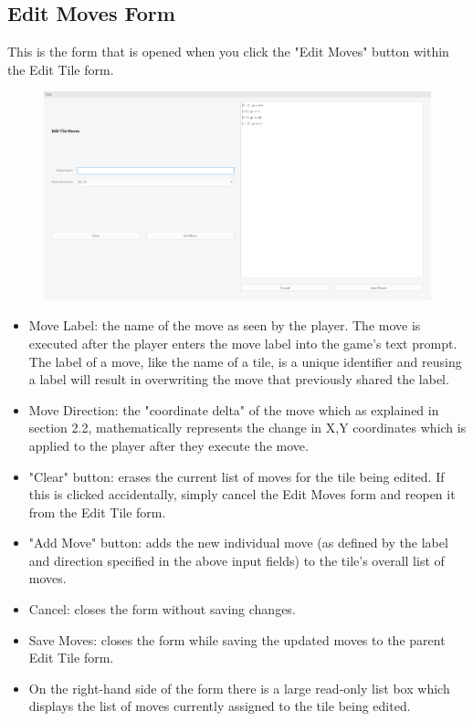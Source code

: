 \documentclass[class=article,crop=false]{standalone} \usepackage[margin=1in,headheight=57pt,headsep=0.1in]{geometry}
\begin{document}
\subsection{Edit Moves Form}
This is the form that is opened when you click the "Edit Moves" button within the Edit Tile form.
\begin{figure}[H]
	\centering
	\includegraphics[width=1.0\textwidth]{./editMovesForm.png}
\end{figure}
\begin{itemize}
	\item Move Label: the name of the move as seen by the player. The move is executed after the player enters the move label into the game's text prompt. The label of a move, like the name of a tile, is a unique identifier and reusing a label will result in overwriting the move that previously shared the label.
	\item Move Direction: the "coordinate delta" of the move which as explained in section 2.2, mathematically represents the change in X,Y coordinates which is applied to the player after they execute the move.
	\item "Clear" button: erases the current list of moves for the tile being edited. If this is clicked accidentally, simply cancel the Edit Moves form and reopen it from the Edit Tile form.
	\item "Add Move" button: adds the new individual move (as defined by the label and direction specified in the above input fields) to the tile's overall list of moves.
	\item Cancel: closes the form without saving changes.
	\item Save Moves: closes the form while saving the updated moves to the parent Edit Tile form.
	\item On the right-hand side of the form there is a large read-only list box which displays the list of moves currently assigned to the tile being edited.
\end{itemize}
\end{document}
